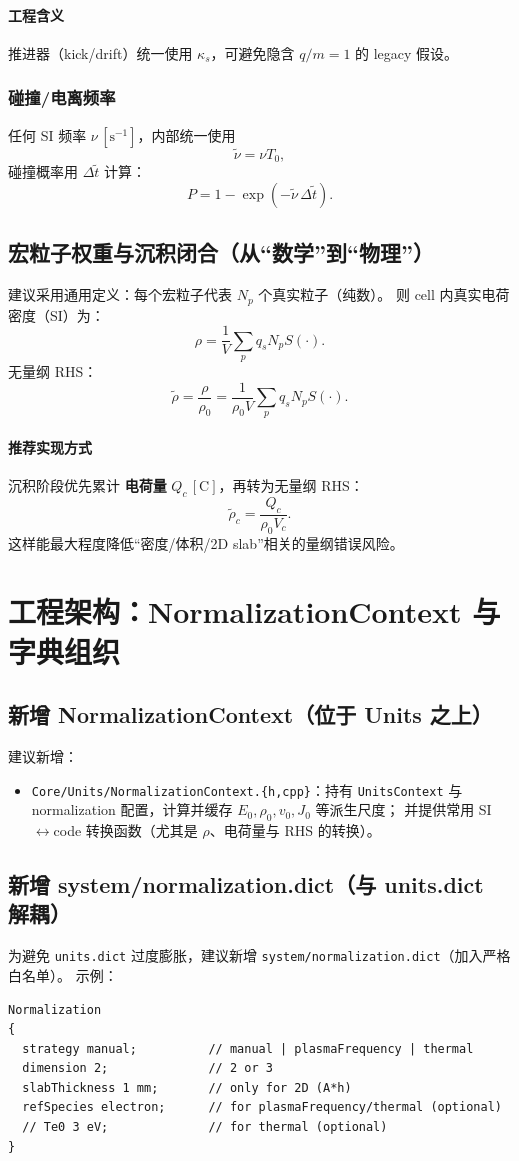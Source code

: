 \documentclass[11pt,a4paper]{ctexart}
\begin{document}
\paragraph{工程含义}
推进器（kick/drift）统一使用 $\kappa_s$，可避免隐含 $q/m=1$ 的 legacy 假设。

\subsubsection{碰撞/电离频率}
任何 SI 频率 $\nu\,[\mathrm{s^{-1}}]$，内部统一使用
\[
\tilde{\nu}=\nu T_0,
\]
碰撞概率用 $\Delta\tilde t$ 计算：
\[
P=1-\exp(-\tilde{\nu}\,\Delta\tilde{t}).
\]

\subsection{宏粒子权重与沉积闭合（从“数学”到“物理”）}
建议采用通用定义：每个宏粒子代表 $N_p$ 个真实粒子（纯数）。
则 cell 内真实电荷密度（SI）为：
\[
\rho = \frac{1}{V}\sum_p q_s N_p S(\cdot).
\]
无量纲 RHS：
\[
\tilde{\rho}=\frac{\rho}{\rho_0}=\frac{1}{\rho_0 V}\sum_p q_s N_p S(\cdot).
\]
\paragraph{推荐实现方式}
沉积阶段优先累计 \textbf{电荷量} $Q_c\,[\mathrm{C}]$，再转为无量纲 RHS：
\[
\tilde{\rho}_c=\frac{Q_c}{\rho_0 V_c}.
\]
这样能最大程度降低“密度/体积/2D slab”相关的量纲错误风险。

\section{工程架构：NormalizationContext 与字典组织}
\subsection{新增 NormalizationContext（位于 Units 之上）}
建议新增：
\begin{itemize}
\item \texttt{Core/Units/NormalizationContext.\{h,cpp\}}：持有 \texttt{UnitsContext} 与 normalization 配置，计算并缓存 $E_0,\rho_0,v_0,J_0$ 等派生尺度；
并提供常用 SI$\leftrightarrow$code 转换函数（尤其是 $\rho$、电荷量与 RHS 的转换）。
\end{itemize}

\subsection{新增 system/normalization.dict（与 units.dict 解耦）}
为避免 \texttt{units.dict} 过度膨胀，建议新增 \texttt{system/normalization.dict}（加入严格白名单）。
示例：
\begin{verbatim}
Normalization
{
  strategy manual;          // manual | plasmaFrequency | thermal
  dimension 2;              // 2 or 3
  slabThickness 1 mm;       // only for 2D (A*h)
  refSpecies electron;      // for plasmaFrequency/thermal (optional)
  // Te0 3 eV;              // for thermal (optional)
}
\end{verbatim}
\end{document}
